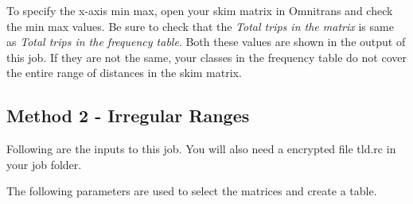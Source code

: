 \documentclass[
  letterpaper,
  DIV=11,
  numbers=noendperiod]{scrreprt}
\newenvironment{Shaded}{\begin{snugshade}}{\end{snugshade}}
\newcommand{\CommentTok}[1]{\textcolor[rgb]{0.37,0.37,0.37}{#1}}
\newcommand{\DecValTok}[1]{\textcolor[rgb]{0.68,0.00,0.00}{#1}}
\newcommand{\KeywordTok}[1]{\textcolor[rgb]{0.00,0.23,0.31}{\textbf{#1}}}
\newcommand{\NormalTok}[1]{\textcolor[rgb]{0.00,0.23,0.31}{#1}}
\newcommand{\OperatorTok}[1]{\textcolor[rgb]{0.37,0.37,0.37}{#1}}
\newcommand{\VariableTok}[1]{\textcolor[rgb]{0.07,0.07,0.07}{#1}}
\begin{document}
\begin{tcolorbox}[enhanced jigsaw, arc=.35mm, toptitle=1mm, colbacktitle=quarto-callout-important-color!10!white, toprule=.15mm, opacitybacktitle=0.6, coltitle=black, opacityback=0, colback=white, colframe=quarto-callout-important-color-frame, rightrule=.15mm, bottomtitle=1mm, breakable, bottomrule=.15mm, title=\textcolor{quarto-callout-important-color}{\faExclamation}\hspace{0.5em}{Important}, titlerule=0mm, leftrule=.75mm, left=2mm]

To specify the x-axis min max, open your skim matrix in Omnitrans and
check the min max values. Be sure to check that the \emph{Total trips in
the matrix} is same as \emph{Total trips in the frequency table}. Both
these values are shown in the output of this job. If they are not the
same, your classes in the frequency table do not cover the entire range
of distances in the skim matrix.

\end{tcolorbox}

\begin{Shaded}
\end{Shaded}

\subsection{Method 2 - Irregular
Ranges}\label{method-2---irregular-ranges}

Following are the inputs to this job. You will also need a encrypted
file tld.rc in your job folder.

The following parameters are used to select the matrices and create a
table.
\end{document}
